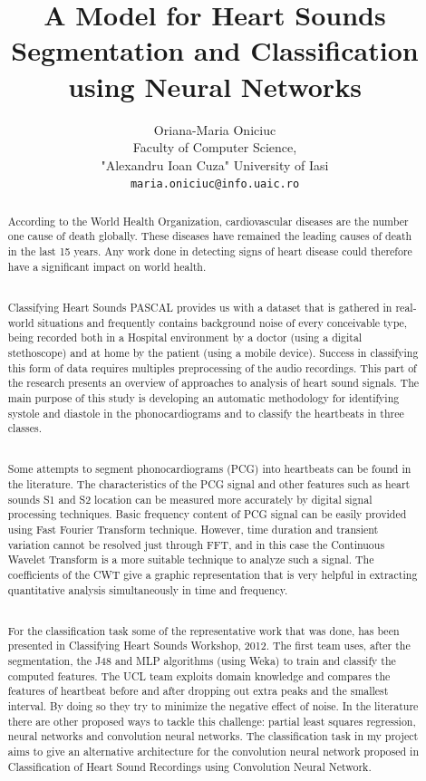 \documentclass{article}
\title{A Model for Heart Sounds Segmentation and Classification using Neural Networks}
\author{Oriana-Maria Oniciuc\\
  Faculty of Computer Science,\\
  "Alexandru Ioan Cuza" University of Iasi\\
  \texttt{maria.oniciuc@info.uaic.ro}}
\date{}
\begin{document}
\maketitle

\begin{abstract}
According to the World Health Organization, cardiovascular diseases are the number one cause of death globally. These diseases have remained the leading causes of death in the last 15 years. Any work done in detecting signs of heart disease could therefore have a significant impact on world health. 
\\
\

Classifying Heart Sounds PASCAL provides us with a dataset that is gathered in real-world situations and frequently contains background noise of every conceivable type, being recorded both in a Hospital environment by a doctor (using a digital stethoscope) and at home by the patient (using a mobile device). Success in classifying this form of data requires multiples preprocessing of the audio recordings. This part of the research presents an overview of approaches to analysis of heart sound signals. The main purpose of this study is developing an automatic methodology for identifying systole and diastole in the phonocardiograms and to classify the heartbeats in three classes.
\\
\

Some attempts to segment phonocardiograms (PCG) into heartbeats can be found in the literature. The characteristics of the PCG signal and other features such as heart sounds S1 and S2 location can be measured more accurately by digital signal processing techniques. Basic frequency content of PCG signal can be easily provided using Fast Fourier Transform technique.  However, time duration and transient variation cannot be resolved just through FFT, and in this case the Continuous Wavelet Transform is a more suitable technique to analyze such a signal. The coefficients of the CWT give a graphic representation that is very helpful in extracting quantitative analysis simultaneously in time and frequency.
\\
\

For the classification task some of the representative work that was done, has been presented in Classifying Heart Sounds Workshop, 2012. The first team uses, after the segmentation, the J48 and MLP algorithms (using Weka) to train and classify the computed features. The UCL team exploits domain knowledge and compares the features of heartbeat before and after dropping out extra peaks and the smallest interval. By doing so they try to minimize the negative effect of noise. In the literature there are other proposed ways to tackle this challenge: partial least squares regression, neural networks and convolution neural networks. The classification task in my project aims to give an alternative architecture for the convolution neural network proposed in Classification of Heart Sound Recordings using Convolution Neural Network.




\end{abstract}
\end{document}
